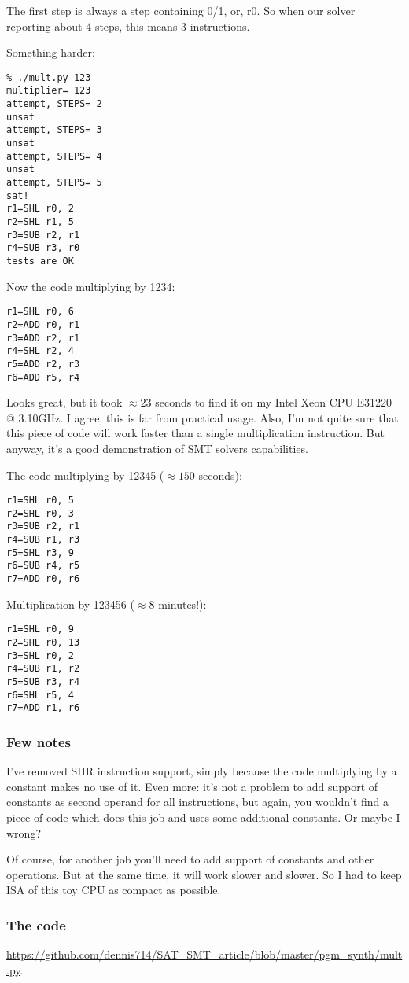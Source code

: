 The first step is always a step containing 0/1, or, r0.
So when our solver reporting about 4 steps, this means 3 instructions.

Something harder:

\begin{lstlisting}
% ./mult.py 123
multiplier= 123
attempt, STEPS= 2
unsat
attempt, STEPS= 3
unsat
attempt, STEPS= 4
unsat
attempt, STEPS= 5
sat!
r1=SHL r0, 2
r2=SHL r1, 5
r3=SUB r2, r1
r4=SUB r3, r0
tests are OK
\end{lstlisting}

Now the code multiplying by 1234:

\begin{lstlisting}
r1=SHL r0, 6
r2=ADD r0, r1
r3=ADD r2, r1
r4=SHL r2, 4
r5=ADD r2, r3
r6=ADD r5, r4
\end{lstlisting}

Looks great, but it took $\approx 23$ seconds to find it on my Intel Xeon CPU E31220 @ 3.10GHz.
I agree, this is far from practical usage.
Also, I'm not quite sure that this piece of code will work faster than a single multiplication instruction.
But anyway, it's a good demonstration of SMT solvers capabilities.

The code multiplying by 12345 ($\approx 150$ seconds):

\begin{lstlisting}
r1=SHL r0, 5
r2=SHL r0, 3
r3=SUB r2, r1
r4=SUB r1, r3
r5=SHL r3, 9
r6=SUB r4, r5
r7=ADD r0, r6
\end{lstlisting}

Multiplication by 123456 ($\approx 8$ minutes!):

\begin{lstlisting}
r1=SHL r0, 9
r2=SHL r0, 13
r3=SHL r0, 2
r4=SUB r1, r2
r5=SUB r3, r4
r6=SHL r5, 4
r7=ADD r1, r6
\end{lstlisting}

\subsubsection{Few notes}

I've removed SHR instruction support, simply because the code multiplying by a constant makes no use of it.
Even more: it's not a problem to add support of constants as second operand for all instructions,
but again, you wouldn't find a piece of code which does this job and uses some additional constants.
Or maybe I wrong?

Of course, for another job you'll need to add support of constants and other operations.
But at the same time, it will work slower and slower.
So I had to keep \ac{ISA} of this toy \ac{CPU} as compact as possible.

\subsubsection{The code}

\url{https://github.com/dennis714/SAT_SMT_article/blob/master/pgm_synth/mult.py}.


